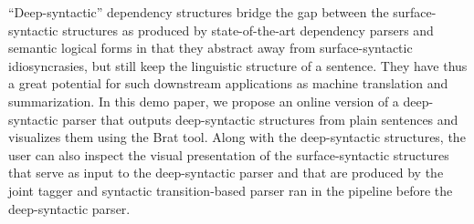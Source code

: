 ``Deep-syntactic'' dependency structures bridge the gap between the surface-syntactic structures as produced by state-of-the-art dependency parsers and semantic logical forms in that they abstract away from  surface-syntactic idiosyncrasies, but still keep the linguistic structure of a sentence. They have thus a great potential for such downstream applications as machine translation and summarization. In this demo paper, we propose an online version of a deep-syntactic parser that outputs deep-syntactic structures from plain sentences and visualizes them using the Brat tool. Along with the deep-syntactic structures, the user can also inspect the visual presentation of the surface-syntactic structures that serve as input to the deep-syntactic parser and that are produced by the joint tagger and syntactic transition-based parser ran in the pipeline before the deep-syntactic parser.
